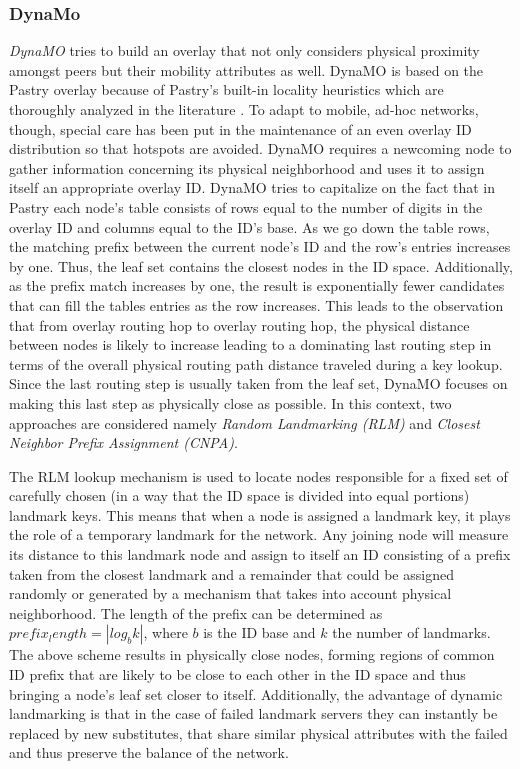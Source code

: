 \subsubsection{DynaMo}
\emph{DynaMO} \cite{WZS2004} tries to build an overlay that not only 
considers physical proximity amongst peers but their mobility attributes as well.
DynaMO is based on the Pastry overlay
because of Pastry's built-in locality
heuristics which are thoroughly analyzed in the literature \cite{CDCR2002a}.  
To adapt to mobile, ad-hoc networks, though, special care has been put in 
the maintenance of an even overlay ID distribution so that hotspots are
avoided. DynaMO requires a newcoming node to gather information concerning its
physical neighborhood and uses it to assign itself an appropriate overlay ID.
DynaMO tries to capitalize on the fact that in Pastry each node's table consists
of rows equal to the number of digits in the overlay ID and columns equal to
the ID's base. As we go down the table rows, the matching prefix between the
current node's ID and the row's entries increases by one. Thus, the leaf set
contains the closest nodes in the ID space. Additionally, as the prefix match
increases by one, the result is exponentially fewer candidates that can fill the
tables entries as the row increases. This leads to the observation
\cite{antony_pastry_2001,CDCR2002a} that from overlay routing hop to overlay
routing hop, the physical distance between nodes is likely to increase leading to
a dominating last routing step in terms of the overall physical routing path
distance traveled during a key lookup. Since the last routing step is usually
taken from the leaf set, DynaMO focuses on making this last step as physically
close as possible. In this context, two approaches are considered namely
\emph{Random Landmarking (RLM)} and \emph{Closest Neighbor Prefix Assignment
(CNPA)}.

The RLM lookup mechanism is used to locate nodes responsible for a fixed set of carefully
chosen (in a way that the ID space is divided into equal portions) landmark
keys. This means that when a node is assigned a landmark key, it plays the
role of a temporary landmark for the network. Any joining node will measure its
distance to this landmark node and assign to itself an ID consisting
of a prefix taken from the closest landmark and a remainder that could be
assigned randomly or generated by a mechanism that takes into account physical
neighborhood. The length of the prefix can be determined as
$prefix_length=|log_b k|$, where $b$ is the ID base and $k$ the number of
landmarks. The above scheme results in physically close nodes, forming regions
of common ID prefix that are likely to be close to each other in the ID space
and thus bringing a node's leaf set closer to itself. Additionally, the
advantage of dynamic landmarking is that in the case of failed landmark servers
they can instantly be replaced by new substitutes, that share similar physical
attributes with the failed and thus preserve the balance of the network.

